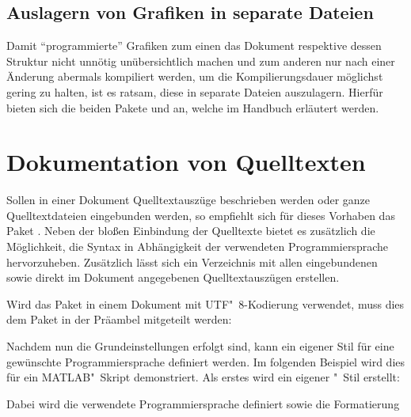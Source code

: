 \documentclass[%
  english,ngerman,%
  cdgeometry=no,DIV=12,automark,%
]{tudscrartcl}
\begin{document}
\subsection{Auslagern von Grafiken in separate Dateien}
Damit \enquote{programmierte} Grafiken zum einen das Dokument respektive dessen 
Struktur nicht unnötig unübersichtlich machen und zum anderen nur nach einer 
Änderung abermals kompiliert werden, um die Kompilierungsdauer möglichst gering 
zu halten, ist es ratsam, diese in separate Dateien auszulagern. Hierfür bieten 
sich die beiden Pakete  und  an, welche 
im Handbuch erläutert werden.



\section{Dokumentation von Quelltexten}
Sollen in einer Dokument Quelltextauszüge beschrieben werden oder ganze 
Quelltextdateien eingebunden werden, so empfiehlt sich für dieses Vorhaben das 
Paket . Neben der bloßen Einbindung der Quelltexte bietet es 
zusätzlich die Möglichkeit, die Syntax in Abhängigkeit der verwendeten 
Programmiersprache hervorzuheben. Zusätzlich lässt sich ein Verzeichnis mit 
allen eingebundenen sowie direkt im Dokument angegebenen Quelltextauszügen 
erstellen.
%
\begin{Hint}
\usepackage{listings}
\end{Hint}
%
Wird das Paket in einem Dokument mit UTF"~8-Kodierung verwendet, muss dies dem 
Paket in der Präambel mitgeteilt werden:
%
\begin{Hint}
\end{Hint}
%
Nachdem nun die Grundeinstellungen erfolgt sind, kann ein eigener Stil für eine 
gewünschte Programmiersprache definiert werden. Im folgenden Beispiel wird dies 
für ein MATLAB"~Skript demonstriert. Als erstes wird  ein 
eigener "~Stil erstellt:
%
\begin{Hint*}
\end{Hint*}
%
Dabei wird die verwendete Programmiersprache definiert sowie die Formatierung 
\end{document}
